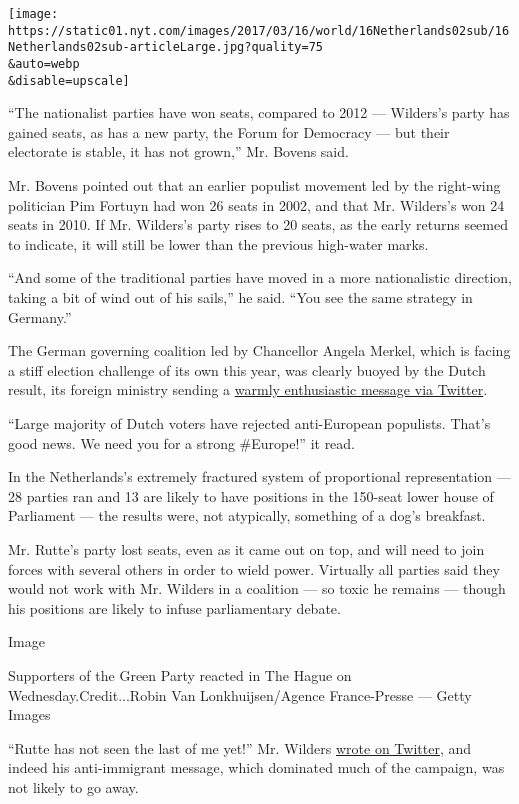 \texttt{[image: https://static01.nyt.com/images/2017/03/16/world/16Netherlands02sub/16Netherlands02sub-articleLarge.jpg?quality=75\\\&auto=webp\\\&disable=upscale]}

``The nationalist parties have won seats, compared to 2012 --- Wilders's
party has gained seats, as has a new party, the Forum for Democracy ---
but their electorate is stable, it has not grown,'' Mr. Bovens said.

Mr. Bovens pointed out that an earlier populist movement led by the
right-wing politician Pim Fortuyn had won 26 seats in 2002, and that Mr.
Wilders's won 24 seats in 2010. If Mr. Wilders's party rises to 20
seats, as the early returns seemed to indicate, it will still be lower
than the previous high-water marks.

``And some of the traditional parties have moved in a more nationalistic
direction, taking a bit of wind out of his sails,'' he said. ``You see
the same strategy in Germany.''

The German governing coalition led by Chancellor Angela Merkel, which is
facing a stiff election challenge of its own this year, was clearly
buoyed by the Dutch result, its foreign ministry sending a
\href{https://twitter.com/GermanyDiplo/status/842115682095517696}{warmly
enthusiastic message via Twitter}.

``Large majority of Dutch voters have rejected anti-European populists.
That's good news. We need you for a strong \#Europe!'' it read.

In the Netherlands's extremely fractured system of proportional
representation --- 28 parties ran and 13 are likely to have positions in
the 150-seat lower house of Parliament --- the results were, not
atypically, something of a dog's breakfast.

Mr. Rutte's party lost seats, even as it came out on top, and will need
to join forces with several others in order to wield power. Virtually
all parties said they would not work with Mr. Wilders in a coalition ---
so toxic he remains --- though his positions are likely to infuse
parliamentary debate.

Image

Supporters of the Green Party reacted in The Hague on
Wednesday.Credit...Robin Van Lonkhuijsen/Agence France-Presse --- Getty
Images

``Rutte has not seen the last of me yet!'' Mr. Wilders
\href{https://twitter.com/geertwilderspvv/status/842113131442765826}{wrote
on Twitter}, and indeed his anti-immigrant message, which dominated much
of the campaign, was not likely to go away.

